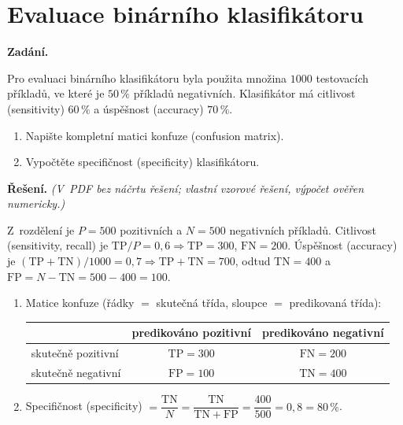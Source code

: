 \section{Evaluace binárního klasifikátoru}

\noindent\textbf{Zadání.}\par
Pro evaluaci binárního klasifikátoru byla použita množina $1000$ testovacích příkladů, ve které
je $50\,\%$ příkladů negativních. Klasifikátor má citlivost (sensitivity) $60\,\%$ a úspěšnost
(accuracy) $70\,\%$.
\begin{enumerate}
  \item Napište kompletní matici konfuze (confusion matrix).
  \item Vypočtěte specifičnost (specificity) klasifikátoru.
\end{enumerate}

\medskip
\noindent\textbf{Řešení.} \textit{(V~PDF bez náčrtu řešení; vlastní vzorové řešení, výpočet ověřen numericky.)}\par
Z~rozdělení je $P = 500$ pozitivních a $N = 500$ negativních příkladů.
Citlivost (sensitivity, recall) je $\mathrm{TP}/P = 0{,}6 \Rightarrow \mathrm{TP} = 300$, $\mathrm{FN} = 200$.
Úspěšnost (accuracy) je $(\mathrm{TP}+\mathrm{TN})/1000 = 0{,}7 \Rightarrow \mathrm{TP}+\mathrm{TN} = 700$,
odtud $\mathrm{TN} = 400$ a $\mathrm{FP} = N - \mathrm{TN} = 500 - 400 = 100$.

\begin{enumerate}
  \item Matice konfuze (řádky $=$ skutečná třída, sloupce $=$ predikovaná třída):
    \begin{center}
    \begin{tabular}{lcc}
    \toprule
    & predikováno pozitivní & predikováno negativní \\
    \midrule
    skutečně pozitivní & $\mathrm{TP} = 300$ & $\mathrm{FN} = 200$ \\
    skutečně negativní & $\mathrm{FP} = 100$ & $\mathrm{TN} = 400$ \\
    \bottomrule
    \end{tabular}
    \end{center}
  \item Specifičnost (specificity) $= \dfrac{\mathrm{TN}}{N} = \dfrac{\mathrm{TN}}{\mathrm{TN}+\mathrm{FP}}
    = \dfrac{400}{500} = 0{,}8 = 80\,\%$.
\end{enumerate}

